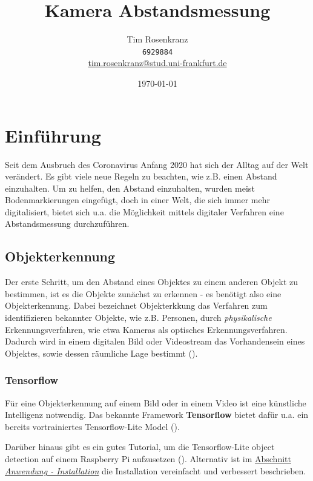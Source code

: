 \documentclass[12pt]{article}
\title{Kamera Abstandsmessung}
\author{Tim Rosenkranz \\ \texttt{6929884} \\ \href{mailto:tim.rosenkranz@stud.uni-frankfurt.de}{tim.rosenkranz@stud.uni-frankfurt.de}}
\date{\today}
\theoremstyle{definition}
\begin{document}
\maketitle

\tableofcontents

\newpage

\section{Einführung}
\begin{flushleft}
Seit dem Ausbruch des Coronavirus Anfang 2020 hat sich der Alltag auf der Welt verändert. Es gibt viele neue Regeln zu beachten, wie z.B. einen Abstand einzuhalten. Um zu helfen, den Abstand einzuhalten, wurden meist Bodenmarkierungen eingefügt, doch in einer Welt, die sich immer mehr digitalisiert, bietet sich u.a. die Möglichkeit mittels digitaler Verfahren eine Abstandsmessung durchzuführen.
\end{flushleft}

\subsection{Objekterkennung}
\begin{flushleft}
Der erste Schritt, um den Abstand eines Objektes zu einem anderen Objekt zu bestimmen, ist es die Objekte zunächst zu erkennen - es benötigt also eine Objekterkennung. Dabei bezeichnet Objekterkkung das \glqq Verfahren zum identifizieren bekannter Objekte\grqq, wie z.B. Personen, durch \textit{physikalische} Erkennungsverfahren, wie etwa Kameras als optisches Erkennungsverfahren. Dadurch wird in einem digitalen Bild oder Videostream das Vorhandensein eines Objektes, sowie dessen räumliche Lage bestimmt (\cite{obj-erk-def}).
\end{flushleft}

\subsubsection{Tensorflow}
\begin{flushleft}
Für eine Objekterkennung auf einem Bild oder in einem Video ist eine künstliche Intelligenz notwendig. Das bekannte Framework \textbf{Tensorflow} bietet dafür u.a. ein bereits vortrainiertes Tensorflow-Lite Model (\cite{tensorflow-docu}).

Darüber hinaus gibt es ein gutes Tutorial, um die Tensorflow-Lite object detection auf einem Raspberry Pi aufzusetzen (\cite{rap-tut-de}). Alternativ ist im \hyperlink{Install}{Abschnitt \textit{Anwendung - Installation}} die Installation vereinfacht und verbessert beschrieben.
\end{flushleft}
\end{document}
